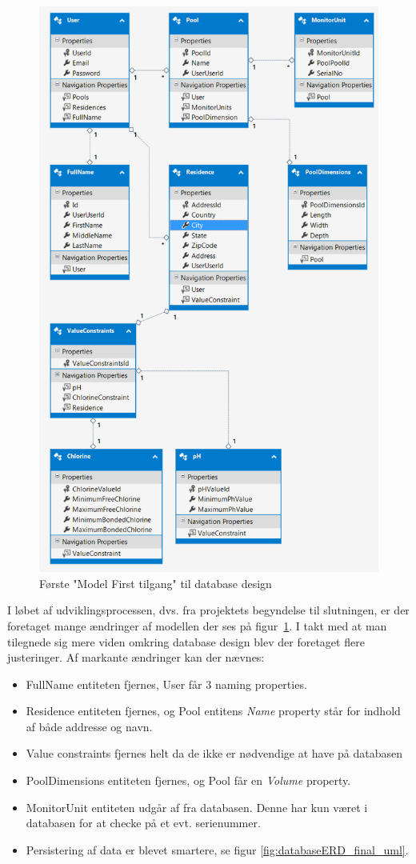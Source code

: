 \begin{figure}[h]
	\centering
	\includegraphics[width=0.8\linewidth]{figs/design/databaseERD}
	\caption{Første "Model First tilgang" til database design}
	\label{fig:databaseERD_firstattempt_uml}
\end{figure}

I løbet af udviklingsprocessen, dvs. fra projektets begyndelse til slutningen, er der foretaget mange ændringer af modellen der ses på figur~\ref{fig:databaseERD_firstattempt_uml}. 
I takt med at man tilegnede sig mere viden omkring database design blev der foretaget flere justeringer. Af markante ændringer kan der nævnes:

\begin{itemize}
	\item FullName entiteten fjernes, User får 3 naming properties.
	\item Residence entiteten fjernes, og Pool entitens \textit{Name} property står for indhold af både addresse og navn.
	\item Value constraints fjernes helt da de ikke er nødvendige at have på databasen
	\item PoolDimensions entiteten fjernes, og Pool får en \textit{Volume} property.
	\item MonitorUnit entiteten udgår af fra databasen. Denne har kun været i databasen for at checke på et evt. serienummer.
	\item Persistering af data er blevet smartere, se figur \ref{fig:databaseERD_final_uml}.
\end{itemize}

